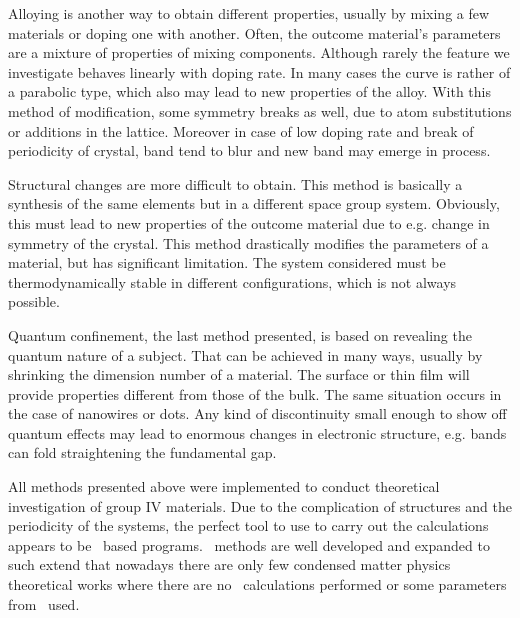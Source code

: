 Alloying is another way to obtain different properties, usually by mixing a few materials or doping one with another. Often, the outcome material's parameters are a mixture of properties of mixing components. Although rarely the feature we investigate behaves linearly with doping rate. In many cases the curve is rather of a parabolic type, which also may lead to new properties of the alloy. With this method of modification, some symmetry breaks as well, due to atom substitutions or additions in the lattice. Moreover in case of low doping rate and break of periodicity of crystal, band tend to blur and new band may emerge in process.

Structural changes are more difficult to obtain. This method is basically a synthesis of the same elements but in a different space group system. Obviously, this must lead to new properties of the outcome material due to e.g. change in symmetry of the crystal. This method drastically modifies the parameters of a material, but has significant limitation. The system considered must be thermodynamically stable in different configurations, which is not always possible.

Quantum confinement, the last method presented, is based on revealing the quantum nature of a subject. That can be achieved in many ways, usually by shrinking the dimension number of a material. The surface or thin film will provide properties different from those of the bulk. The same situation occurs in the case of nanowires or dots. Any kind of discontinuity small enough to show off quantum effects may lead to enormous changes in electronic structure, e.g. bands can fold straightening the fundamental gap.

All methods presented above were implemented to conduct theoretical investigation of group IV materials. Due to the complication of structures and the periodicity of the systems, the perfect tool to use to carry out the calculations appears to be \DFT\ based programs. \abinitio\ methods are well developed and expanded to such extend that nowadays there are only few condensed matter physics theoretical works where there are no \DFT\ calculations performed or some parameters from \DFT\ used.